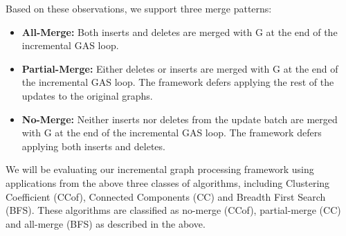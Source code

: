 Based on these observations, we support three merge patterns:
\begin{itemize}
\item \textbf{All-Merge:} Both inserts and deletes are merged with G at the end of the incremental GAS loop.		
\item \textbf{Partial-Merge:} Either deletes or inserts are merged with G at the end of the incremental GAS loop. The framework defers applying the rest of the updates to the original graphs.
\item \textbf{No-Merge:} Neither inserts nor deletes from the update batch are merged with G at the end of the  incremental GAS loop. The framework defers applying both inserts and deletes. 
\end{itemize}

We will be evaluating our incremental graph processing framework using applications from the above three classes of algorithms, including Clustering Coefficient (CCof), Connected Components (CC) and Breadth First Search  (BFS). These algorithms are classified as no-merge (CCof), partial-merge (CC) and all-merge (BFS) as described in the above. 
